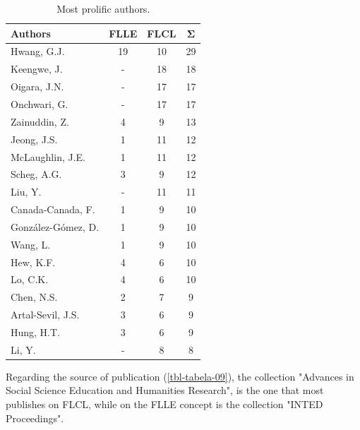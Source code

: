 \documentclass{textolivre}
\begin{document}
\begin{table}[htpb]
\caption{Most prolific authors.}
\label{tbl-tabela-08}
\centering
\begin{tabular}{lccc}
\toprule
\textbf{Authors}   & \textbf{FLLE} & \textbf{FLCL} & \textbf{Σ} \\ 
\midrule
Hwang, G.J.        & 19            & 10            & 29         \\ 
Keengwe, J.        & -             & 18            & 18         \\ 
Oigara, J.N.       & -             & 17            & 17         \\ 
Onchwari, G.       & -             & 17            & 17         \\ 
Zainuddin, Z.      & 4             & 9             & 13         \\ 
Jeong, J.S.        & 1             & 11            & 12         \\ 
McLaughlin, J.E.   & 1             & 11            & 12         \\ 
Scheg, A.G.        & 3             & 9             & 12         \\ 
Liu, Y.            & -             & 11            & 11         \\ 
Canada-Canada, F.  & 1             & 9             & 10         \\ 
González-Gómez, D. & 1             & 9             & 10         \\ 
Wang, L.           & 1             & 9             & 10         \\ 
Hew, K.F.          & 4             & 6             & 10         \\ 
Lo, C.K.           & 4             & 6             & 10         \\ 
Chen, N.S.         & 2             & 7             & 9          \\ 
Artal-Sevil, J.S.  & 3             & 6             & 9          \\ 
Hung, H.T.         & 3             & 6             & 9          \\ 
Li, Y.             & -             & 8             & 8          \\ 
\bottomrule
\end{tabular}
\end{table}

Regarding the source of publication (\cref{tbl-tabela-09}), the collection "Advances in Social Science Education and Humanities Research", is the one that most publishes on FLCL, while on the FLLE concept is the collection "INTED Proceedings".
\end{document}
